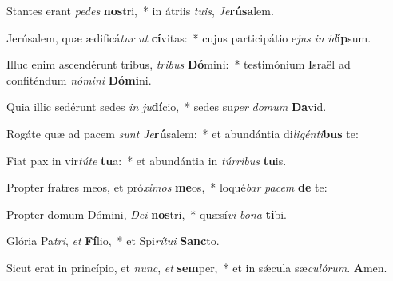 \setcounter{versecount}{2}

\vs Stantes erant \textit{pe}\textit{des} \textbf{nos}tri,~* in átriis \textit{tu}\textit{is}, \textit{Je}\textbf{rú}\textbf{sa}lem.

\vs Jerúsalem, quæ ædificá\textit{tur} \textit{ut} \textbf{cí}vitas:~* cujus participátio e\textit{jus} \textit{in} \textit{id}\textbf{íp}sum.

\vs Illuc enim ascendérunt tribus, \textit{tri}\textit{bus} \textbf{Dó}mini:~* testimónium Israël ad confiténdum \textit{nó}\textit{mi}\textit{ni} \textbf{Dó}\textbf{mi}ni.

\vs Quia illic sedérunt sedes \textit{in} \textit{ju}\textbf{dí}cio,~* sedes su\textit{per} \textit{do}\textit{mum} \textbf{Da}vid.

\vs Rogáte quæ ad pacem \textit{sunt} \textit{Je}\textbf{rú}salem:~* et abundántia di\textit{li}\textit{gén}\textit{ti}\textbf{bus} te:

\vs Fiat pax in vir\textit{tú}\textit{te} \textbf{tu}a:~* et abundántia in \textit{túr}\textit{ri}\textit{bus} \textbf{tu}is.

\vs Propter fratres meos, et pró\textit{xi}\textit{mos} \textbf{me}os,~* loqué\textit{bar} \textit{pa}\textit{cem} \textbf{de} te:

\vs Propter domum Dómini, \textit{De}\textit{i} \textbf{nos}tri,~* quæsí\textit{vi} \textit{bo}\textit{na} \textbf{ti}bi.

\vs Glória Pa\textit{tri}, \textit{et} \textbf{Fí}lio,~* et Spi\textit{rí}\textit{tu}\textit{i} \textbf{Sanc}to.

\vs Sicut erat in princípio, et \textit{nunc}, \textit{et} \textbf{sem}per,~* et in sǽcula sæ\textit{cu}\textit{ló}\textit{rum}. \textbf{A}men.

